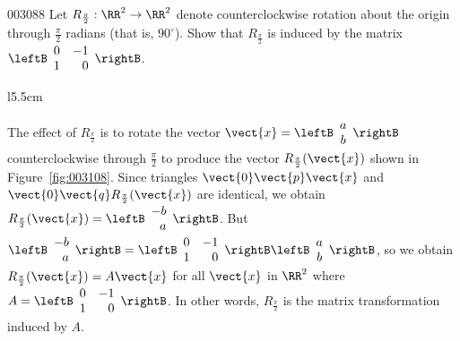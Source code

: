 \begin{example}{}{003088}
Let $R_{\frac{\pi}{2}} : \RR^{2} \to \RR^{2}$ denote counterclockwise rotation about the origin through $\frac{\pi}{2}$ radians (that is, $90^{\circ}$)\footnotemark. Show that $R_{\frac{\pi}{2}}$ is induced by the matrix $\leftB \begin{array}{rr}
 0 & -1 \\
 1 & 0
 \end{array} \rightB$.



\begin{solution}
 \begin{wrapfigure}{l}{5.5cm}
	\centering
	
	\caption{\label{fig:003108}}
\end{wrapfigure}


\setlength{\rightskip}{0pt plus 200pt} 
The effect of $R_{\frac{\pi}{2}}$ is to rotate the vector $\vect{x} = \leftB \begin{array}{c}
 a \\
 b
 \end{array} \rightB$ counterclockwise through  $\frac{\pi}{2}$ to produce the vector $R_{\frac{\pi}{2}}(\vect{x})$ shown in Figure~\ref{fig:003108}. Since triangles $\vect{0}\vect{p}\vect{x}$ and $\vect{0}\vect{q}R_{\frac{\pi}{2}}(\vect{x})$ are identical, we obtain $R_{\frac{\pi}{2}}(\vect{x}) = \leftB \begin{array}{r}
 -b \\
 a
 \end{array} \rightB$. But $\leftB \begin{array}{r}
 -b \\
 a
 \end{array} \rightB = \leftB \begin{array}{rr}
 0 & -1 \\
 1 & 0
 \end{array} \rightB \leftB \begin{array}{c}
 a \\
 b
 \end{array} \rightB$, so we obtain $R_{\frac{\pi}{2}}(\vect{x}) = A\vect{x}$ for all $\vect{x}$ in $\RR^2$ where $A = \leftB \begin{array}{rr}
0 & -1 \\
1 & 0
\end{array} \rightB$. In other words, $R_{\frac{\pi}{2}}$ is the matrix transformation induced by $A$.
\vspace{1em}
\end{solution}
\end{example}

